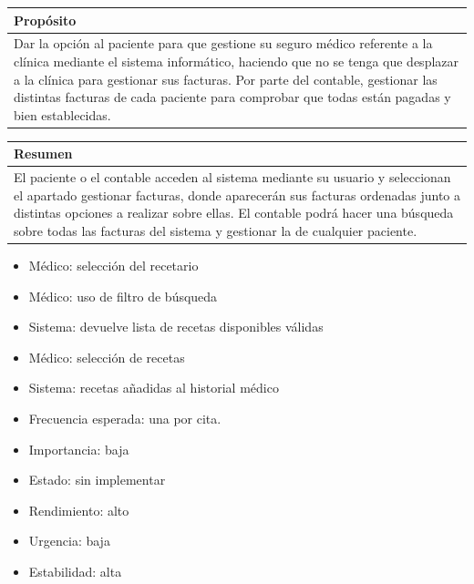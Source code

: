 \documentclass[11pt,a4paper]{article}
\begin{document}
\begin{table}[H]
	\centering
	\begin{tabular}{l}
		\hline
		\multicolumn{1}{|l|}{Propósito} \\ \hline
		Dar la opción al paciente para que gestione su seguro médico referente a la clínica mediante el sistema informático, haciendo que no se tenga que desplazar a la clínica para gestionar sus facturas. Por parte del contable, gestionar las distintas facturas de cada paciente para comprobar que todas están pagadas y bien establecidas.
	\end{tabular}
	
\end{table}

\begin{table}[H]
	\centering
	\begin{tabular}{l}
		\hline
		\multicolumn{1}{|l|}{Resumen} \\ \hline
		El paciente o el contable acceden al sistema mediante su usuario y seleccionan el apartado gestionar facturas, donde aparecerán sus facturas ordenadas junto a distintas opciones a realizar sobre ellas. El contable podrá hacer una búsqueda sobre todas las facturas del sistema y gestionar la de cualquier paciente.
	\end{tabular}
\end{table}



\begin{itemize}
	\item Médico: selección del recetario
	\item Médico: uso de filtro de búsqueda
	\item Sistema: devuelve lista de recetas disponibles válidas
	\item Médico: selección de recetas
	\item Sistema: recetas añadidas al historial médico
\end{itemize}


\begin{itemize}
	\item Frecuencia esperada: una por cita.
	\item Importancia: baja
	\item Estado: sin implementar
	\item Rendimiento: alto
	\item Urgencia: baja
	\item Estabilidad: alta
\end{itemize}
\end{document}
